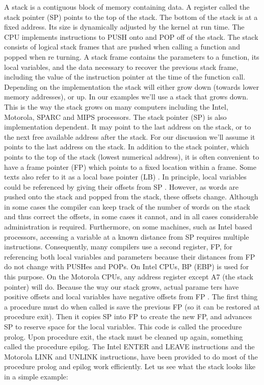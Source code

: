 \documentclass[12pt]{article}
\begin{document}
A stack is a contiguous block of memory containing data. A register called the stack pointer (SP) points to the 
top of the stack. The bottom of the stack is at a fixed address. Its size is dynamically adjusted by the kernel at 
run time. The CPU implements instructions to PUSH onto and POP off of the stack. The stack consists of 
logical stack frames  that are pushed when calling a function and popped when re turning. A stack frame 
contains the parameters to a function, its local variables, and the data necessary to recover the previous stack frame,
including the value of the instruction pointer at the time of the function call. Depending on the 
implementation the stack will either grow down (towards lower memory addresses), or up. In our examples 
we'll use a stack that grows down. This is the way the stack grows on many computers including the Intel, 
Motorola, SPARC and MIPS processors. The  stack pointer (SP) is also implementation dependent.  It may point 
to the last address on the stack, or to the next free available address after the stack. For our discussion we'll 
assume it points to the last address on the stack. In addition to the stack pointer, which points to the top of the 
stack (lowest numerical address), it is often convenient to have a frame pointer (FP) which points to a fixed 
location within a frame. Some texts also refer to it as a local base pointer (LB) . In principle, local variables 
could be referenced by giving their offsets from SP . However, as words are pushed onto the stack and popped 
from the stack, these offsets change. Although in some cases the compiler can keep track of the number of 
words on the stack and thus correct the offsets, in some cases it cannot, and in all cases  considerable 
administration is required. Furthermore, on some machines, such as Intel based processors, accessing a variable 
at a known distance from SP requires multiple instructions. Consequently, many compilers use a second 
register, FP, for referencing both local variables and parameters because their distances from FP do not change 
with PUSHes and POPs. On Intel CPUs, BP (EBP) is used for this purpose. On the Motorola CPUs, any 
address register except A7 (the stack pointer) will do. Because the way our stack grows, actual parame ters have 
positive offsets and local variables have negative offsets from FP . The first thing a procedure must do when 
called is save the previous FP (so it can be restored at procedure exit). Then it copies SP into FP to create the 
new FP, and advances SP to reserve space for the local variables. This code is called  the procedure prolog. 
Upon procedure exit, the stack must be cleaned up again, something called  the procedure epilog. The Intel  
ENTER and LEAVE instructions and the Motorola LINK and UNLINK  instructions, have been provided to do 
most of the procedure prolog and epilog work efficiently. Let us see what the stack looks like in a simple 
example:
\end{document}
